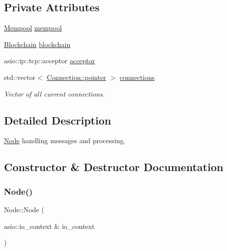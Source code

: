 \subsection*{Private Attributes}
\begin{DoxyCompactItemize}
\item 
\mbox{\hyperlink{classMempool}{Mempool}} \mbox{\hyperlink{classNode_a2c3b3df5c2c8f4b7e95e1aa3dfd80e25}{mempool}}
\item 
\mbox{\hyperlink{classBlockchain}{Blockchain}} \mbox{\hyperlink{classNode_a631d922988b25901cb0e98a5274c2588}{blockchain}}
\item 
asio\+::ip\+::tcp\+::acceptor \mbox{\hyperlink{classNode_a3b0f7b49f99b1aad5ffeffb5b721b7a0}{acceptor}}
\item 
std\+::vector$<$ \mbox{\hyperlink{classConnection_a1bb6cd8924ff091e9b053e3368735c9c}{Connection\+::pointer}} $>$ \mbox{\hyperlink{classNode_ab9ba07b806d024e8461fae70bea349c0}{connections}}
\begin{DoxyCompactList}\small\item\em Vector of all current connections. \end{DoxyCompactList}\end{DoxyCompactItemize}


\subsection{Detailed Description}
\mbox{\hyperlink{classNode}{Node}} handling messages and processing. 

\subsection{Constructor \& Destructor Documentation}
\mbox{\label{classNode_a69479b3f2c9ca25cc6f178c30c8b7da8}} 
\subsubsection{\texorpdfstring{Node()}{Node()}}
{\footnotesize\ttfamily Node\+::\+Node (\begin{DoxyParamCaption}\item[{asio\+::io\+\_\+context \&}]{io\+\_\+context }\end{DoxyParamCaption})\hspace{0.3cm}{\ttfamily [explicit]}}



